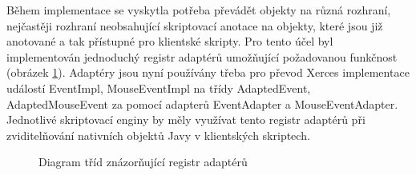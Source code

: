 Během implementace se vyskytla potřeba převádět objekty na různá rozhraní, nejčastěji rozhraní neobsahující skriptovací anotace na objekty, které jsou již anotované a tak přístupné pro klientské skripty. Pro tento účel byl implementován jednoduchý registr adaptérů umožňující požadovanou funkčnost (obrázek \ref{Figure.AdapterRegistry}). Adaptéry jsou nyní používány třeba pro převod Xerces implementace událostí EventImpl, MouseEventImpl na třídy AdaptedEvent, AdaptedMouseEvent za pomocí adapterů EventAdapter a MouseEventAdapter. Jednotlivé skriptovací enginy by měly využívat tento registr adaptérů při zviditelňování nativních objektů Javy v klientských skriptech.

\begin{figure}[H]
  \begin{center}
    \caption{Diagram tříd znázorňující registr adaptérů}
    \label{Figure.AdapterRegistry}
  \end{center}
\end{figure}

